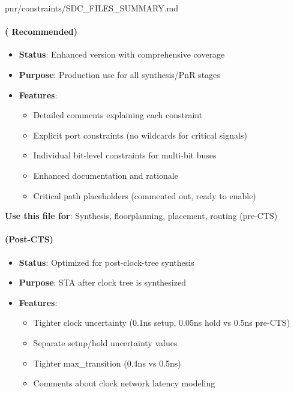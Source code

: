 \begin{relocated}{pnr/constraints/SDC_FILES_SUMMARY.md}
\paragraph{\texorpdfstring{ (\ok{}
Recommended)}{ ( Recommended)}}\label{tm:pd:constraints-sdc-files-summary:phase1-cpu-enhancedsdc-white-check-mark-recommended}

\begin{itemize}
\tightlist
\item
  \textbf{Status}: Enhanced version with comprehensive coverage
\item
  \textbf{Purpose}: Production use for all synthesis/\allowbreak{}PnR
  stages
\item
  \textbf{Features}:

  \begin{itemize}
  \tightlist
  \item
    Detailed comments explaining each constraint
  \item
    Explicit port constraints (no wildcards for critical signals)
  \item
    Individual bit-level constraints for multi-bit buses
  \item
    Enhanced documentation and rationale
  \item
    Critical path placeholders (commented out, ready to enable)
  \end{itemize}
\end{itemize}

\textbf{Use this file for}: Synthesis, floorplanning, placement, routing
(pre-CTS)

\paragraph{\texorpdfstring{
(Post-CTS)}{ (Post-CTS)}}\label{tm:pd:constraints-sdc-files-summary:phase1-cpu-post-ctssdc-post-cts}

\begin{itemize}
\tightlist
\item
  \textbf{Status}: Optimized for post-clock-tree synthesis
\item
  \textbf{Purpose}: STA after clock tree is synthesized
\item
  \textbf{Features}:

  \begin{itemize}
  \tightlist
  \item
    Tighter clock uncertainty (0.1ns setup, 0.05ns hold vs 0.5ns
    pre-CTS)
  \item
    Separate setup/\allowbreak{}hold uncertainty values
  \item
    Tighter max\_\allowbreak{}transition (0.4ns vs 0.5ns)
  \item
    Comments about clock network latency modeling
  \end{itemize}
\end{itemize}


\end{relocated}
